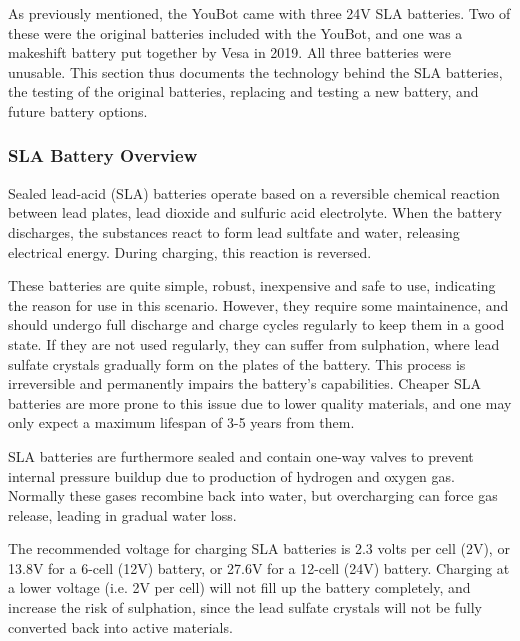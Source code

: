 \documentclass[a4paper, 12pt]{article}
\newif\ifshownotes
\newcommand{\notes}[1]{\ifshownotes\textcolor{blue}{#1}\fi}
\begin{document}
    \notes{draft 1, 11.05 12pm\\
    Here are some good web pages about the Slealed Lead Acid (SLA) batteries:
https://batterymasters.co.uk/blog/post/How%
and
https://www.power-sonic.com/blog/how-to-charge-a-lead-acid-battery/
and
https://www.powerstream.com/SLA.htm}

    As previously mentioned, the YouBot came with three 24V SLA batteries. Two of these were the original batteries included with the YouBot, and one was a makeshift battery put together by Vesa in 2019. All three batteries were unusable. This section thus documents the technology behind the SLA batteries, the testing of the original batteries, replacing and testing a new battery, and future battery options. 

    \subsubsection{SLA Battery Overview}

    Sealed lead-acid (SLA) batteries operate based on a reversible chemical reaction between lead plates, lead dioxide and sulfuric acid electrolyte. When the battery discharges, the substances react to form lead sultfate and water, releasing electrical energy. During charging, this reaction is reversed.

    These batteries are quite simple, robust, inexpensive and safe to use, indicating the reason for use in this scenario. However, they require some maintainence, and should undergo full discharge and charge cycles regularly to keep them in a good state. If they are not used regularly, they can suffer from sulphation, where lead sulfate crystals gradually form on the plates of the battery. This process is irreversible and permanently impairs the battery's capabilities. Cheaper SLA batteries are more prone to this issue due to lower quality materials, and one may only expect a maximum lifespan of 3-5 years from them. 

    SLA batteries are furthermore sealed and contain one-way valves to prevent internal pressure buildup due to production of hydrogen and oxygen gas. Normally these gases recombine back into water, but overcharging can force gas release, leading in gradual water loss. 

    The recommended voltage for charging SLA batteries is 2.3 volts per cell (2V), or 13.8V for a 6-cell (12V) battery, or 27.6V for a 12-cell (24V) battery. Charging at a lower voltage (i.e. 2V per cell) will not fill up the battery completely, and increase the risk of sulphation, since the lead sulfate crystals will not be fully converted back into active materials. 
\end{document}
